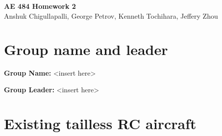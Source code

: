 




\begin{center}
    {\Large\textbf{AE 484 Homework 2}}\\
    Anshuk Chigullapalli, George Petrov, Kenneth Tochihara, Jeffery Zhou\\

\end{center}


\section{Group name and leader}
    \textbf{Group Name:} <insert here>
    
    \textbf{Group Leader:} <insert here>

\section{Existing tailless RC aircraft}

